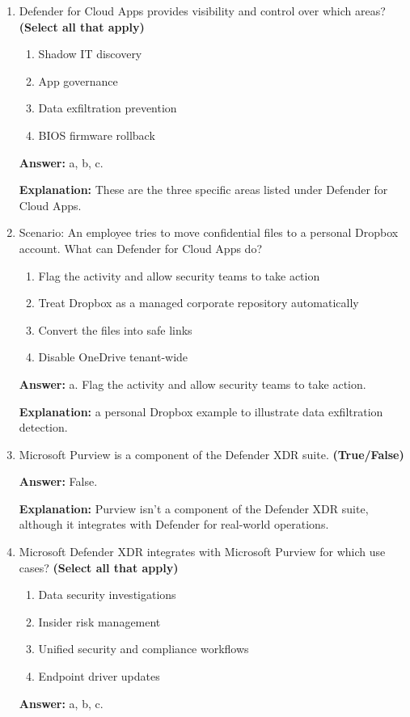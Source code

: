 \documentclass[10pt]{article}
\begin{document}
\begin{enumerate}[leftmargin=*]
\item Defender for Cloud Apps provides visibility and control over which areas? \textbf{(Select all that apply)}
\begin{enumerate}[label=\alph*., leftmargin=1.5em]
\item Shadow IT discovery
\item App governance
\item Data exfiltration prevention
\item BIOS firmware rollback
\end{enumerate}
\textbf{Answer:} a, b, c.

\textbf{Explanation:} These are the three specific areas listed under Defender for Cloud Apps.

\item Scenario: An employee tries to move confidential files to a personal Dropbox account. What can Defender for Cloud Apps do?
\begin{enumerate}[label=\alph*., leftmargin=1.5em]
\item Flag the activity and allow security teams to take action
\item Treat Dropbox as a managed corporate repository automatically
\item Convert the files into safe links
\item Disable OneDrive tenant-wide
\end{enumerate}
\textbf{Answer:} a. Flag the activity and allow security teams to take action.

\textbf{Explanation:} a personal Dropbox example to illustrate data exfiltration detection.

\item Microsoft Purview is a component of the Defender XDR suite. \textbf{(True/False)}

\textbf{Answer:} False.

\textbf{Explanation:} Purview isn’t a component of the Defender XDR suite, although it integrates with Defender for real-world operations.

\item Microsoft Defender XDR integrates with Microsoft Purview for which use cases? \textbf{(Select all that apply)}
\begin{enumerate}[label=\alph*., leftmargin=1.5em]
\item Data security investigations
\item Insider risk management
\item Unified security and compliance workflows
\item Endpoint driver updates
\end{enumerate}
\textbf{Answer:} a, b, c.


\end{enumerate}
\end{document}
